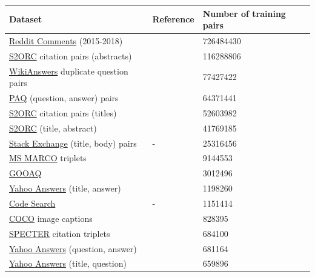 \begin{table}[!htb]
\centering
\small
\begin{tabularx}{16cm}{@{}lp{4.5cm}Y@{} }
\toprule
\textbf{Dataset} & \textbf{Reference} & \textbf{Number of training pairs} \\
\midrule
\midrule 
\href{https://github.com/PolyAI-LDN/conversational-datasets/tree/master/reddit}{Reddit Comments} (2015-2018) & \textcite{henderson_19} & \num{726484430} \\
\href{https://github.com/allenai/s2orc}{S2ORC} citation pairs (abstracts) & \textcite{lo_20} & \num{116288806} \\
\href{https://github.com/afader/oqa#wikianswers-corpus}{WikiAnswers} duplicate question pairs & \textcite{fader_14} & \num{77427422} \\
\href{https://github.com/facebookresearch/PAQ}{PAQ} (question, answer) pairs & \textcite{lewis_21} & \num{64371441} \\
\href{https://github.com/allenai/s2orc}{S2ORC} citation pairs (titles) & \textcite{lo_20} & \num{52603982} \\
\href{https://github.com/allenai/s2orc}{S2ORC} (title, abstract) & \textcite{lo_20} & \num{41769185} \\
\href{https://huggingface.co/datasets/flax-sentence-embeddings/stackexchange_xml}{Stack Exchange} (title, body) pairs & - & \num{25316456} \\
\href{https://microsoft.github.io/msmarco/}{MS MARCO} triplets & \textcite{craswell_21} & \num{9144553} \\
\href{https://github.com/allenai/gooaq}{GOOAQ} & \textcite{khashabi_21} & \num{3012496} \\
\href{https://www.kaggle.com/soumikrakshit/yahoo-answers-dataset}{Yahoo Answers} (title, answer) & \textcite{zhang_15} & \num{1198260} \\
\href{https://huggingface.co/datasets/code_search_net}{Code Search} & - & \num{1151414} \\
\href{https://cocodataset.org/#home}{COCO} image captions & \textcite{lin_14} & \num{828395} \\
\href{https://github.com/allenai/specter}{SPECTER} citation triplets & \textcite{cohan_20} & \num{684100} \\
\href{https://www.kaggle.com/soumikrakshit/yahoo-answers-dataset}{Yahoo Answers} (question, answer) & \textcite{zhang_15} & \num{681164} \\
\href{https://www.kaggle.com/soumikrakshit/yahoo-answers-dataset}{Yahoo Answers} (title, question) & \textcite{zhang_15} & \num{659896} \\

\end{tabularx}
\end{table}
